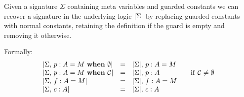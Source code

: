 
\begin{definition}
    Given a signature $\Sigma$ containing meta variables and guarded constants
    we can recover a signature in the underlying logic $\left|{\Sigma}\right|$ by
    replacing guarded constants with normal constants, retaining the definition
    if the guard is empty and removing it otherwise.

    Formally:
    \[\begin{array}{lclcl}
	\left|{{\Sigma},\,{} {p} : {A} = {M} ~\mathbf{when}~ {\emptyset}}\right|
	    & = & {\left|{\Sigma}\right|},\,{} {{p} : {A} = {M}} \\
	\left|{{\Sigma},\,{} {p} : {A} = {M} ~\mathbf{when}~ {\mathcal{C}}}\right|
	    & = & {\left|{\Sigma}\right|},\,{} {{p} : {A}} && \mathrm{if} ~ \mathcal{C} \neq \emptyset \\
	\left|{{\Sigma},\,{} {f} : {A} = {M}}\right|
	    & = & {\left|{\Sigma}\right|},\,{} {{f} : {A} = {M}} \\
	\left|{{\Sigma},\,{} {c} : {A}}\right|
	    & = & {\left|{\Sigma}\right|},\,{} {{c} : {A}} \\
    \end{array}\]
\end{definition}

